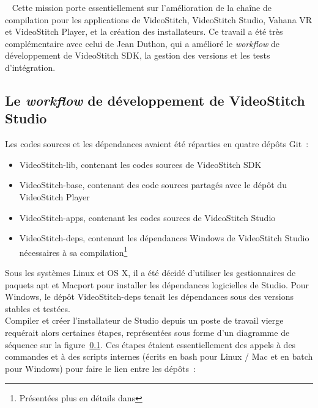 \ \newline
Cette mission porte essentiellement sur l'amélioration de la chaîne de compilation
pour les applications de VideoStitch, VideoStitch Studio, Vahana VR et VideoStitch
Player, et la création des installateurs. Ce travail a été très complémentaire avec
celui de Jean Duthon, qui a amélioré le \textit{workflow} de développement de VideoStitch SDK,
la gestion des versions et les tests d'intégration.

\subsection{Le \textit{workflow} de développement de VideoStitch Studio}
\label{workflow-studio}
Les codes sources et les dépendances avaient été réparties en quatre dépôts Git~: 
\begin{itemize}
  \item VideoStitch-lib, contenant les codes sources de VideoStitch SDK
  \item VideoStitch-base, contenant des code sources partagés avec le dépôt du VideoStitch Player
  \item VideoStitch-apps, contenant les codes sources de VideoStitch Studio
  \item VideoStitch-deps, contenant les dépendances Windows de VideoStitch Studio 
  nécessaires à sa compilation\footnote{Présentées plus en détails dans }
\end{itemize}
Sous les systèmes Linux et OS X, il a été décidé d'utiliser les gestionnaires
de paquets apt et Macport pour installer les dépendances logicielles de Studio. Pour
Windows, le dépôt VideoStitch-deps tenait les dépendances sous des versions stables et testées.\\
\newline
Compiler et créer l'installateur de Studio depuis un poste de travail vierge requérait alors
certaines étapes, représentées sous forme d'un diagramme de séquence sur la figure~\ref{workflow-studio}.
Ces étapes étaient essentiellement des appels à des commandes et à des scripts internes
(écrits en bash pour Linux / Mac et en batch pour Windows) pour faire le lien entre les dépôts~:
